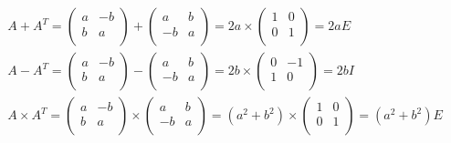 \documentclass[dvipdfmx,uplatex]{jsarticle}
\begin{document}
  \begin{equation}
    \begin{aligned}
        &A + A^{T} = \begin{pmatrix} a & -b \\ b & a \\ \end{pmatrix} + \begin{pmatrix} a & b \\ -b & a \\ \end{pmatrix} = 2a \times \begin{pmatrix} 1 & 0 \\ 0 & 1 \\ \end{pmatrix} = 2aE \nonumber\\
        &A - A^{T} = \begin{pmatrix} a & -b \\ b & a \\ \end{pmatrix} - \begin{pmatrix} a & b \\ -b & a \\ \end{pmatrix} = 2b \times \begin{pmatrix} 0 & -1 \\ 1 & 0 \\ \end{pmatrix} = 2bI \nonumber\\
        &A \times A^{T} = \begin{pmatrix} a & -b \\ b & a \\ \end{pmatrix} \times \begin{pmatrix} a & b \\ -b & a \\ \end{pmatrix} = (a^2 + b^2) \times \begin{pmatrix} 1 & 0 \\ 0 & 1 \\ \end{pmatrix} = (a^2 + b^2)E \nonumber\\
    \end{aligned}
  \end{equation}
\end{document}
